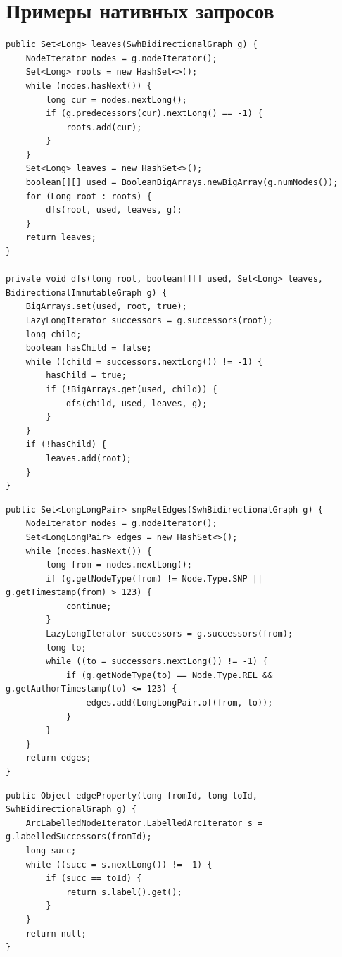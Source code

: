 \documentclass[times,specification,annotation]{itmo-student-thesis}
\begin{document}
\chapter{Примеры нативных запросов}\label{sec:app:native}
\begin{lstlisting}[float=!h,caption={Получение листьев графа нативным способом},label={lst:native-dfs}]
public Set<Long> leaves(SwhBidirectionalGraph g) {
    NodeIterator nodes = g.nodeIterator();
    Set<Long> roots = new HashSet<>();
    while (nodes.hasNext()) {
        long cur = nodes.nextLong();
        if (g.predecessors(cur).nextLong() == -1) {
            roots.add(cur);
        }
    }
    Set<Long> leaves = new HashSet<>();
    boolean[][] used = BooleanBigArrays.newBigArray(g.numNodes());
    for (Long root : roots) {
        dfs(root, used, leaves, g);
    }
    return leaves;
}

private void dfs(long root, boolean[][] used, Set<Long> leaves, BidirectionalImmutableGraph g) {
    BigArrays.set(used, root, true);
    LazyLongIterator successors = g.successors(root);
    long child;
    boolean hasChild = false;
    while ((child = successors.nextLong()) != -1) {
        hasChild = true;
        if (!BigArrays.get(used, child)) {
            dfs(child, used, leaves, g);
        }
    }
    if (!hasChild) {
        leaves.add(root);
    }
}
\end{lstlisting}

\begin{lstlisting}[float=!h,caption={Получение ребер по типам вершин нативным способом},label={lst:native-edges}]
public Set<LongLongPair> snpRelEdges(SwhBidirectionalGraph g) {
    NodeIterator nodes = g.nodeIterator();
    Set<LongLongPair> edges = new HashSet<>();
    while (nodes.hasNext()) {
        long from = nodes.nextLong();
        if (g.getNodeType(from) != Node.Type.SNP || g.getTimestamp(from) > 123) {
            continue;
        }
        LazyLongIterator successors = g.successors(from);
        long to;
        while ((to = successors.nextLong()) != -1) {
            if (g.getNodeType(to) == Node.Type.REL && g.getAuthorTimestamp(to) <= 123) {
                edges.add(LongLongPair.of(from, to));
            }
        }
    }
    return edges;
}
\end{lstlisting}

\begin{lstlisting}[float=!h,caption={Получение свойства ребра нативным способом},label={lst:native-edgeprop}]
public Object edgeProperty(long fromId, long toId, SwhBidirectionalGraph g) {
    ArcLabelledNodeIterator.LabelledArcIterator s = g.labelledSuccessors(fromId);
    long succ;
    while ((succ = s.nextLong()) != -1) {
        if (succ == toId) {
            return s.label().get();
        }
    }
    return null;
}
\end{lstlisting}
\end{document}
